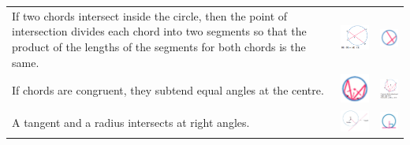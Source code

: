 \documentclass[a4paper,10pt]{report}
\begin{document}
\begin{center}
\begin{tabular}[center]{p{5cm}|p{3cm}|p{2cm}}
		If two chords intersect inside the circle, then the point of intersection divides each chord into two segments so that the product of the lengths of the segments for both chords is the same.                               & \includegraphics[width=3cm]{circle theorem 6}  & \includegraphics[width=2cm]{circle theorem 6 symbol}  \\
		If chords are congruent, they subtend equal angles at the centre.                                                                                                                                                            & \includegraphics[width=3cm]{circle theorem 7}  & \includegraphics[width=2cm]{circle theorem 7 symbol}  \\
		A tangent and a radius intersects at right angles.                                                                                                                                                                           & \includegraphics[width=3cm]{circle theorem 8}  & \includegraphics[width=2cm]{circle theorem 8 symbol}  \\

\end{tabular}
\end{center}
\end{document}
